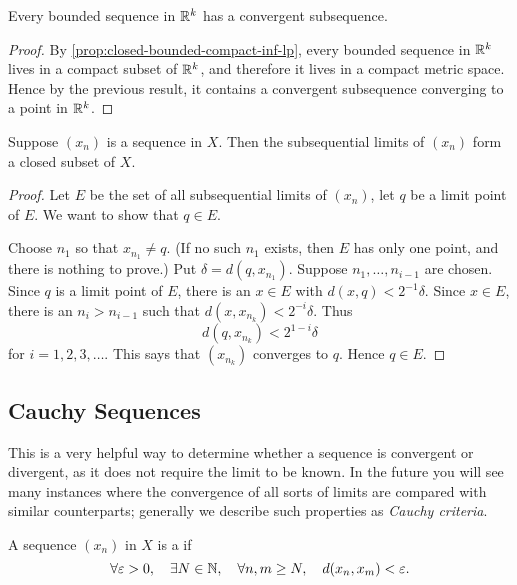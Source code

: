 \begin{corollary}
Every bounded sequence in $\mathbb R^k$ has a convergent subsequence.
\end{corollary}

\begin{proof}
By \cref{prop:closed-bounded-compact-inf-lp}, every bounded sequence in $\mathbb R^k$ lives in a compact subset of $\mathbb R^k$, and therefore it lives in a compact metric space. Hence by the previous result, it contains a convergent subsequence converging to a point in $\mathbb R^k$.
\end{proof}

\begin{lemma}
Suppose $(x_n)$ is a sequence in $X$. Then the subsequential limits of $(x_n)$ form a closed subset of $X$.
\end{lemma}

\begin{proof}
Let $E$ be the set of all subsequential limits of $(x_n)$, let $q$ be a limit point of $E$. We want to show that $q\in E$.

Choose $n_1$ so that $x_{n_1}\neq q$. (If no such $n_1$ exists, then $E$ has only one point, and there is nothing to prove.) Put $\delta=d(q,x_{n_1})$. Suppose $n_1,\dots,n_{i-1}$ are chosen. Since $q$ is a limit point of $E$, there is an $x\in E$ with $d(x,q)<2^{-1}\delta$. Since $x\in E$, there is an $n_i>n_{i-1}$ such that $d(x,x_{n_k})<2^{-i}\delta$. Thus
\[d(q,x_{n_k})<2^{1-i}\delta\]
for $i=1,2,3,\dots$. This says that $(x_{n_k})$ converges to $q$. Hence $q\in E$.
\end{proof}
\pagebreak

\subsection{Cauchy Sequences}
This is a very helpful way to determine whether a sequence is convergent or divergent, as it does not require the limit to be known. In the future you will see many instances where the convergence of all sorts of limits are compared with similar counterparts; generally we describe such properties as \emph{Cauchy criteria}.

\begin{definition}
A sequence $(x_n)$ in $X$ is a  if 
\[\forall\varepsilon>0,\quad\exists N\in\mathbb N,\quad\forall n,m\ge N,\quad d(x_n,x_m)<\varepsilon.\]
\end{definition}

